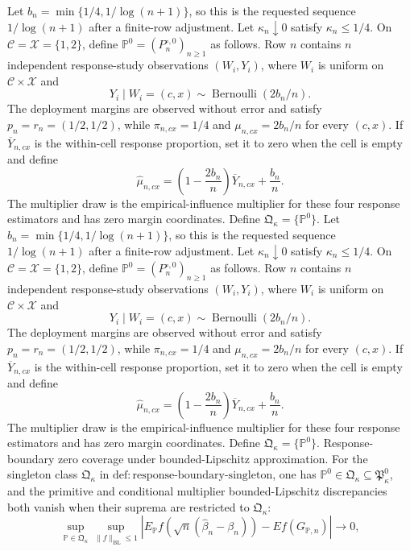 Let \(b_n=\min\{1/4,1/\log(n+1)\}\), so this is the requested sequence \(1/\log(n+1)\) after a finite-row adjustment.  Let \(\kappa_n\downarrow0\) satisfy \(\kappa_n\leq1/4\).  On \(\mathcal C=\mathcal X=\{1,2\}\), define \(\mathbb P^0=(P_n^{\circ,0})_{n\geq1}\) as follows.  Row \(n\) contains \(n\) independent response-study observations \((W_i,Y_i)\), where \(W_i\) is uniform on \(\mathcal C\times\mathcal X\) and
\[
Y_i\mid W_i=(c,x)\sim\operatorname{Bernoulli}(2b_n/n).
\]
The deployment margins are observed without error and satisfy \(p_n=r_n=(1/2,1/2)\), while \(\pi_{n,cx}=1/4\) and \(\mu_{n,cx}=2b_n/n\) for every \((c,x)\).  If \(\overline Y_{n,cx}\) is the within-cell response proportion, set it to zero when the cell is empty and define
\[
\widehat\mu_{n,cx}=\left(1-\frac{2b_n}{n}\right)\overline Y_{n,cx}+\frac{b_n}{n}.
\]
The multiplier draw is the empirical-influence multiplier for these four response estimators and has zero margin coordinates.  Define \(\mathfrak Q_{\kappa}=\{\mathbb P^0\}\).
Let \(b_n=\min\{1/4,1/\log(n+1)\}\), so this is the requested sequence \(1/\log(n+1)\) after a finite-row adjustment.  Let \(\kappa_n\downarrow0\) satisfy \(\kappa_n\leq1/4\).  On \(\mathcal C=\mathcal X=\{1,2\}\), define \(\mathbb P^0=(P_n^{\circ,0})_{n\geq1}\) as follows.  Row \(n\) contains \(n\) independent response-study observations \((W_i,Y_i)\), where \(W_i\) is uniform on \(\mathcal C\times\mathcal X\) and
\[
Y_i\mid W_i=(c,x)\sim\operatorname{Bernoulli}(2b_n/n).
\]
The deployment margins are observed without error and satisfy \(p_n=r_n=(1/2,1/2)\), while \(\pi_{n,cx}=1/4\) and \(\mu_{n,cx}=2b_n/n\) for every \((c,x)\).  If \(\overline Y_{n,cx}\) is the within-cell response proportion, set it to zero when the cell is empty and define
\[
\widehat\mu_{n,cx}=\left(1-\frac{2b_n}{n}\right)\overline Y_{n,cx}+\frac{b_n}{n}.
\]
The multiplier draw is the empirical-influence multiplier for these four response estimators and has zero margin coordinates.  Define \(\mathfrak Q_{\kappa}=\{\mathbb P^0\}\).
Response-boundary zero coverage under bounded-Lipschitz approximation.  For the singleton class \(\mathfrak Q_{\kappa}\) in \(\mathrm{def:response\text{-}boundary\text{-}singleton}\), one has \(\mathbb P^0\in\mathfrak Q_{\kappa}\subseteq\mathfrak P_{\kappa}^{0}\), and the primitive and conditional multiplier bounded-Lipschitz discrepancies both vanish when their suprema are restricted to \(\mathfrak Q_{\kappa}\):
\[
\sup_{\mathbb P\in\mathfrak Q_{\kappa}}
\sup_{\lVert f\rVert_{\mathrm{BL}}\leq1}
\left|
E_{\mathbb P}f\!\left(\sqrt n(\widehat\beta_n-\beta_n)\right)
-E f(G_{\mathbb P,n})
\right|\longrightarrow0,
\]

